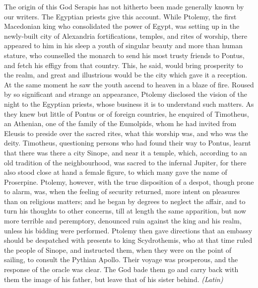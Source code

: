 
The origin of this God Serapis has not hitherto been made generally known by our writers. The Egyptian priests give this account. While Ptolemy, the first Macedonian king who consolidated the power of Egypt, was setting up in the newly-built city of Alexandria fortifications, temples, and rites of worship, there appeared to him in his sleep a youth of singular beauty and more than human stature, who counselled the monarch to send his most trusty friends to Pontus, and fetch his effigy from that country. This, he said, would bring prosperity to the realm, and great and illustrious would be the city which gave it a reception. At the same moment he saw the youth ascend to heaven in a blaze of fire. Roused by so significant and strange an appearance, Ptolemy disclosed the vision of the night to the Egyptian priests, whose business it is to understand such matters. As they knew but little of Pontus or of foreign countries, he enquired of Timotheus, an Athenian, one of the family of the Eumolpids, whom he had invited from Eleusis to preside over the sacred rites, what this worship was, and who was the deity. Timotheus, questioning persons who had found their way to Pontus, learnt that there was there a city Sinope, and near it a temple, which, according to an old tradition of the neighbourhood, was sacred to the infernal Jupiter, for there also stood close at hand a female figure, to which many gave the name of Proserpine. Ptolemy, however, with the true disposition of a despot, though prone to alarm, was, when the feeling of security returned, more intent on pleasures than on religious matters; and he began by degrees to neglect the affair, and to turn his thoughts to other concerns, till at length the same apparition, but now more terrible and peremptory, denounced ruin against the king and his realm, unless his bidding were performed. Ptolemy then gave directions that an embassy should be despatched with presents to king Scydrothemis, who at that time ruled the people of Sinope, and instructed them, when they were on the point of sailing, to consult the Pythian Apollo. Their voyage was prosperous, and the response of the oracle was clear. The God bade them go and carry back with them the image of his father, but leave that of his sister behind. \emph{(Latin)}


